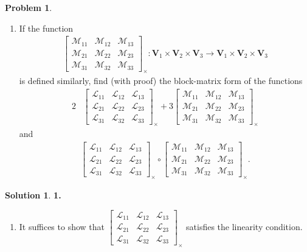 \documentclass{article}
\theoremstyle{definition}
\newtheorem*{prob*}{Problem}
\newtheorem*{sln*}{Solution}
\newcommand{\V}{\mathbf{V}}
\newcommand{\lag}{\mathcal{L}}
\newcommand{\M}{\mathcal{M}}
\begin{document}
\begin{prob*}
\begin{enumerate}
		\item If the function
		\begin{align*}
		\begin{bmatrix}
		\M_{11} & \M_{12} & \M_{13}\\
		\M_{21} & \M_{22} & \M_{23}\\
		\M_{31} & \M_{32} & \M_{33}
		\end{bmatrix}_\times : \V_1 \times \V_2 \times \V_3 \to \V_1\times\V_2\times \V_3
		\end{align*}
		is defined similarly, find (with proof) the block-matrix form of the functions
		\begin{align*}
		2&\begin{bmatrix}
		\lag_{11} & \lag_{12} & \lag_{13}\\
		\lag_{21} & \lag_{22} & \lag_{23}\\
		\lag_{31} & \lag_{32} & \lag_{33}
		\end{bmatrix}_\times 
		+ 
		3\begin{bmatrix}
		\M_{11} & \M_{12} & \M_{13}\\
		\M_{21} & \M_{22} & \M_{23}\\
		\M_{31} & \M_{32} & \M_{33}
		\end{bmatrix}_\times 
		\end{align*}
		and
		\begin{align*}
		\begin{bmatrix}
		\lag_{11} & \lag_{12} & \lag_{13}\\
		\lag_{21} & \lag_{22} & \lag_{23}\\
		\lag_{31} & \lag_{32} & \lag_{33}
		\end{bmatrix}_\times
		\circ 
		\begin{bmatrix}
		\M_{11} & \M_{12} & \M_{13}\\
		\M_{21} & \M_{22} & \M_{23}\\
		\M_{31} & \M_{32} & \M_{33}
		\end{bmatrix}_\times.
		\end{align*}
	\end{enumerate}
	
	\newpage
	
	\begin{sln*}\textbf{1. }
		\begin{enumerate}
			\item It suffices to show that $\begin{bmatrix}
			\lag_{11} & \lag_{12} & \lag_{13}\\
			\lag_{21} & \lag_{22} & \lag_{23}\\
			\lag_{31} & \lag_{32} & \lag_{33}
			\end{bmatrix}_\times$ satisfies the linearity condition.\\
			

\end{enumerate}
\end{sln*}
\end{prob*}
\end{document}

